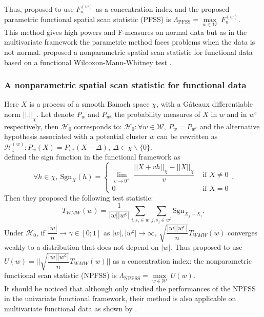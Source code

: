 \noindent Thus, \citet{notre_fonctionnel} proposed to use $F_n^{(w)}$ as a concentration index and the proposed parametric functional spatial scan statistic (PFSS) is $\Lambda_{\text{PFSS}} = \underset{w \in \mathcal{W}}{\max} \  F_n^{(w)}$. \\

\noindent This method gives high powers and F-measures on normal data but as in the multivariate framework the parametric method faces problems when the data is not normal. \citet{wilco_cucala} proposed a nonparametric spatial scan statistic for functional data based on a functional Wilcoxon-Mann-Whitney test \citep{wilco}. \\

\subsubsection{A nonparametric spatial scan statistic for functional data}


\noindent Here $X$ is a process of a smooth Banach space $\chi$, with a  Gâteaux differentiable norm $||.||_{\chi}$. Let denote $P_w$ and $P_{w^\mathsf{c}}$ the probability measures of $X$ in $w$ and in $w^\mathsf{c}$ respectively, then $\mathcal{H}_0$ corresponds to: $\mathcal{H}_0: \forall w \in \mathcal{W}, \ P_w = P_{w^\mathsf{c}}$ and the alternative hypothesis associated with a potential cluster $w$ can be rewritten as $\mathcal{H}_1^{(w)}: P_w(X) = P_{w^\mathsf{c}}(X-\Delta), \ \Delta \in \chi \backslash \{0\}$. \\
\citet{wilco} defined the sign function in the functional framework as 
$$\forall h \in \chi, \ \text{Sgn}_X(h) = \left\{ \begin{array}{cl} \underset{v \rightarrow 0^+}{\lim} \ \dfrac{|| X + vh ||_\chi - ||X||_\chi}{v} &\text{ if } X \neq 0 \\
0 &\text{ if } X = 0 \end{array} \right. .$$
Then they proposed the following test statistic:
$$T_{WMW}(w) = \dfrac{1}{|w| |w^\mathsf{c}|} \sum_{i, s_i \in w} \sum_{j, s_j \in w^\mathsf{c}} \text{Sgn}_{X_j - X_i}.$$
Under $\mathcal{H}_0$, if $\dfrac{|w|}{n} \rightarrow \gamma \in [0;1]$ as $|w|, |w^\mathsf{c}| \rightarrow \infty$, $\sqrt{\dfrac{|w| |w^\mathsf{c}|}{n}} T_{WMW}(w)$ converges weakly to a distribution that does not depend on $|w|$. Thus \citet{wilco_cucala} proposed to use $U(w) = \bigg| \bigg| \sqrt{\dfrac{|w| |w^\mathsf{c}|}{n}} T_{WMW}(w) \bigg| \bigg|$ as a concentration index: the nonparametric functional scan statistic (NPFSS) is $\Lambda_{\text{NPFSS}} = \underset{w \in \mathcal{W}}{\max} \ U(w)$. \\ It should be noticed that although \citet{wilco_cucala} only studied the performances of the NPFSS in the univariate functional framework, their method is also applicable on multivariate functional data as shown by \citet{notre_fonctionnel1}.

